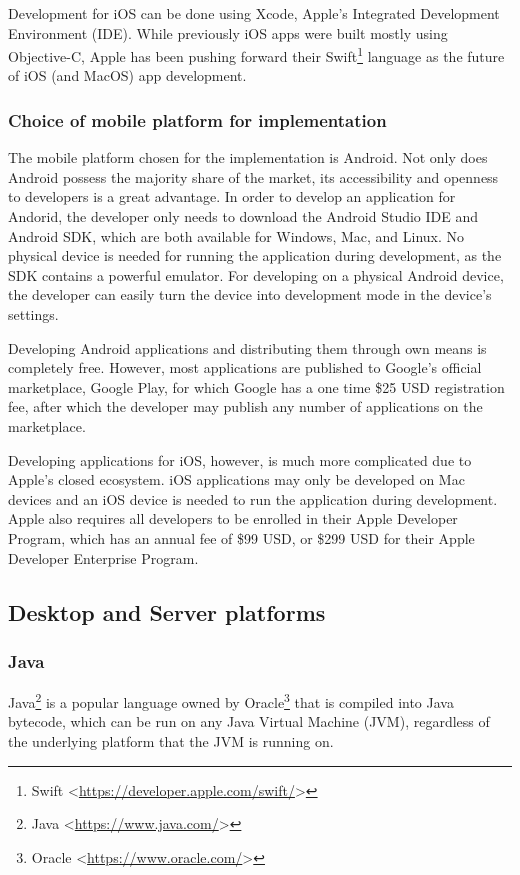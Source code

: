 Development for iOS can be done using Xcode, Apple’s Integrated Development Environment (IDE). While previously iOS apps were built mostly using Objective-C, Apple has been pushing forward their Swift\footnote{Swift <\url{https://developer.apple.com/swift/}>} language as the future of iOS (and MacOS) app development.

\subsubsection*{Choice of mobile platform for implementation}
The mobile platform chosen for the implementation is Android. Not only does Android possess the majority share of the market, its accessibility and openness to developers is a great advantage. In order to develop an application for Andorid, the developer only needs to download the Android Studio IDE and Android SDK, which are both available for Windows, Mac, and Linux. No physical device is needed for running the application during development, as the SDK contains a powerful emulator. For developing on a physical Android device, the developer can easily turn the device into development mode in the device's settings. 

Developing Android applications and distributing them through own means is completely free. However, most applications are published to Google's official marketplace, Google Play, for which Google has a one time \$25 USD registration fee\cite{google-play-fee}, after which the developer may publish any number of applications on the marketplace.

Developing applications for iOS, however, is much more complicated due to Apple's closed ecosystem. iOS applications may only be developed on Mac devices\cite{apple-dev} and an iOS device is needed to run the application during development. Apple also requires all developers to be enrolled in their Apple Developer Program, which has an annual fee of \$99 USD, or \$299 USD for their Apple Developer Enterprise Program\cite{apple-dev-price}.

\subsection{Desktop and Server platforms}
\subsubsection{Java}
Java\footnote{Java <\url{https://www.java.com/}>} is a popular language owned by Oracle\footnote{Oracle <\url{https://www.oracle.com/}>} that is compiled into Java bytecode, which can be run on any Java Virtual Machine (JVM), regardless of the underlying platform that the JVM is running on. 

